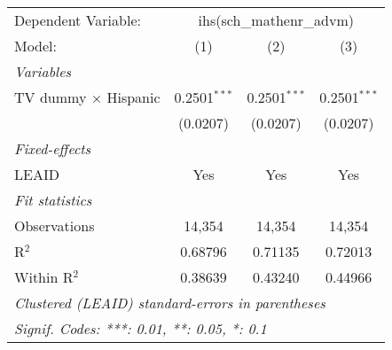 \begin{tabular}{lccc}
\tabularnewline\midrule\midrule
Dependent Variable:&\multicolumn{3}{c}{ihs(sch\_mathenr\_advm)}\\
Model:&(1) & (2) & (3)\\
\midrule \emph{Variables}&   &   &  \\
TV dummy $\times$ Hispanic & 0.2501$^{***}$ & 0.2501$^{***}$ & 0.2501$^{***}$\\
  &(0.0207) & (0.0207) & (0.0207)\\
\midrule \emph{Fixed-effects}&   &   &  \\
LEAID & Yes & Yes & Yes\\
\midrule \emph{Fit statistics}&  & & \\
Observations & 14,354&14,354&14,354\\
R$^2$ & 0.68796&0.71135&0.72013\\
Within R$^2$ & 0.38639&0.43240&0.44966\\
\midrule\midrule\multicolumn{4}{l}{\emph{Clustered (LEAID) standard-errors in parentheses}}\\
\multicolumn{4}{l}{\emph{Signif. Codes: ***: 0.01, **: 0.05, *: 0.1}}\\
\end{tabular}


